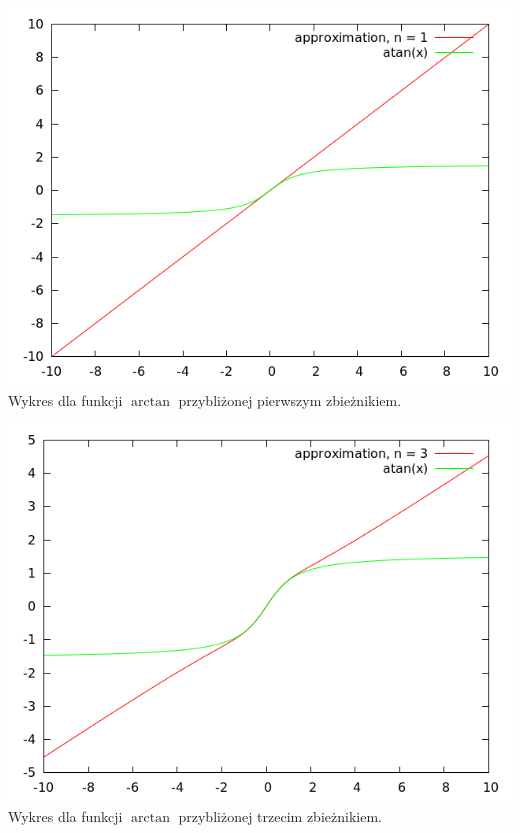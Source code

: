 \documentclass[11pt,leqno]{article}
\begin{document}
\begin{center}
\includegraphics[scale=0.4,natwidth=640,natheight=480]{plot/atan1.png}\\
Wykres dla funkcji $\arctan$ przybliżonej pierwszym zbieżnikiem.

\includegraphics[scale=0.4,natwidth=640,natheight=480]{plot/atan3.png}\\
Wykres dla funkcji $\arctan$ przybliżonej trzecim zbieżnikiem.


\end{center}
\end{document}
